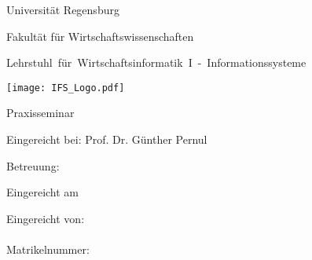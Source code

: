 %
%
%

\thispagestyle{empty}
\begin{titlepage}


\begin{adjustwidth}{-2cm}{}


\renewcommand{\thepage}{}

\begin{center}

\large{Universität Regensburg\\}

\large{Fakultät für Wirtschaftswissenschaften\\}

\large{\mbox{Lehrstuhl für Wirtschaftsinformatik I - Informationssysteme}}

\vspace*{10mm}

\Large{\textbf{\titelthema}}

\vspace*{15mm}
\texttt{[image: IFS\_Logo.pdf]}
\vspace*{15mm}

\Large{Praxisseminar}

\vspace*{10mm}



\Large{Eingereicht bei: Prof. Dr. Günther Pernul\\}

\Large{Betreuung: \betreuer\\}

\vspace*{5mm}

\large{Eingereicht am \abgabedatum\\}

\end{center}

\vfill

\begin{center}
\end{center}
\vspace*{6mm}
\begin{flushleft}
Eingereicht von:\\
\vspace*{7pt}
\authorname\\
Matrikelnummer: \matrikelnr\\




\end{flushleft}

\end{adjustwidth}

\end{titlepage}

\newpage

